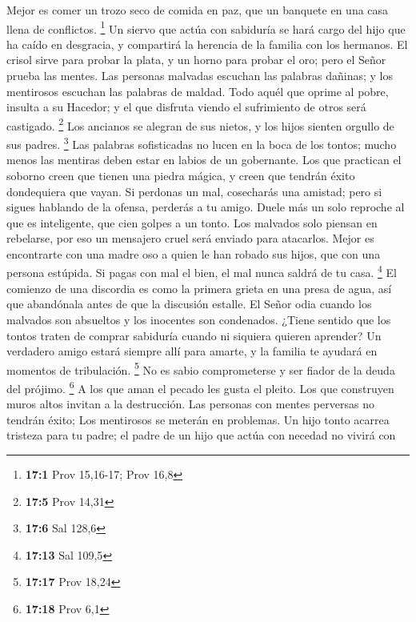  Mejor es comer un trozo seco de comida en paz, que un
banquete en una casa llena de conflictos. \footnote{\textbf{17:1} Prov
  15,16-17; Prov 16,8}  Un siervo que actúa con sabiduría se
hará cargo del hijo que ha caído en desgracia, y compartirá la herencia
de la familia con los hermanos.  El crisol sirve para probar
la plata, y un horno para probar el oro; pero el Señor prueba las
mentes.  Las personas malvadas escuchan las palabras
dañinas; y los mentirosos escuchan las palabras de maldad. 
Todo aquél que oprime al pobre, insulta a su Hacedor; y el que disfruta
viendo el sufrimiento de otros será castigado. \footnote{\textbf{17:5}
  Prov 14,31}  Los ancianos se alegran de sus nietos, y los
hijos sienten orgullo de sus padres. \footnote{\textbf{17:6} Sal 128,6}
 Las palabras sofisticadas no lucen en la boca de los
tontos; mucho menos las mentiras deben estar en labios de un gobernante.
 Los que practican el soborno creen que tienen una piedra
mágica, y creen que tendrán éxito dondequiera que vayan.  Si
perdonas un mal, cosecharás una amistad; pero si sigues hablando de la
ofensa, perderás a tu amigo.  Duele más un solo reproche al
que es inteligente, que cien golpes a un tonto.  Los
malvados solo piensan en rebelarse, por eso un mensajero cruel será
enviado para atacarlos.  Mejor es encontrarte con una madre
oso a quien le han robado sus hijos, que con una persona estúpida.
 Si pagas con mal el bien, el mal nunca saldrá de tu casa.
\footnote{\textbf{17:13} Sal 109,5}  El comienzo de una
discordia es como la primera grieta en una presa de agua, así que
abandónala antes de que la discusión estalle.  El Señor
odia cuando los malvados son absueltos y los inocentes son condenados.
 ¿Tiene sentido que los tontos traten de comprar sabiduría
cuando ni siquiera quieren aprender?  Un verdadero amigo
estará siempre allí para amarte, y la familia te ayudará en momentos de
tribulación. \footnote{\textbf{17:17} Prov 18,24}  No es
sabio comprometerse y ser fiador de la deuda del prójimo. \footnote{\textbf{17:18}
  Prov 6,1}  A los que aman el pecado les gusta el pleito.
Los que construyen muros altos invitan a la destrucción. 
Las personas con mentes perversas no tendrán éxito; Los mentirosos se
meterán en problemas.  Un hijo tonto acarrea tristeza para
tu padre; el padre de un hijo que actúa con necedad no vivirá con
